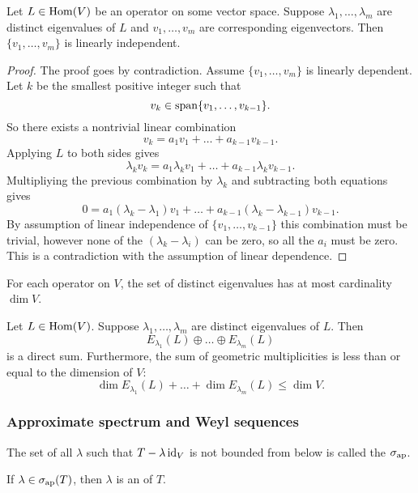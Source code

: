 \begin{proposition}
Let $L\in\operatorname{Hom}(V)$ be an operator on some vector space. Suppose $\lambda_1, \ldots, \lambda_m$ are distinct eigenvalues of $L$ and $v_1,\ldots, v_m$ are corresponding eigenvectors. Then $\{v_1,\ldots, v_m\}$ is linearly independent.
\end{proposition}
\begin{proof}
The proof goes by contradiction. Assume $\{v_1,\ldots, v_m\}$ is linearly dependent. Let $k$ be the smallest positive integer such that
\[ v_k \in \operatorname{span}\{v_1,\ldots, v_{k-1}\}. \]
So there exists a nontrivial linear combination
\[ v_k = a_1v_1+\ldots +a_{k-1}v_{k-1}. \]
Applying $L$ to both sides gives
\[ \lambda_kv_k = a_1\lambda_kv_1+\ldots +a_{k-1}\lambda_kv_{k-1}. \]
Multipliying the previous combination by $\lambda_k$ and subtracting both equations gives
\[ 0= a_1(\lambda_k-\lambda_1)v_1 +\ldots + a_{k-1}(\lambda_k - \lambda_{k-1})v_{k-1}. \]
By assumption of linear independence of $\{v_1,\ldots, v_{k-1}\}$ this combination must be trivial, however none of the $(\lambda_k-\lambda_i)$ can be zero, so all the $a_i$ must be zero. This is a contradiction with the assumption of linear dependence.
\end{proof}
\begin{corollary}
For each operator on $V$, the set of distinct eigenvalues has at most cardinality $\dim V$.
\end{corollary}
\begin{corollary}
Let $L\in\operatorname{Hom}(V)$. Suppose $\lambda_1, \ldots, \lambda_m$ are distinct eigenvalues of $L$. Then
\[ E_{\lambda_1}(L) \oplus \ldots \oplus E_{\lambda_m}(L) \]
is a direct sum. Furthermore, the sum of geometric multiplicities is less than or equal to the dimension of $V$:
\[ \dim E_{\lambda_1}(L) + \ldots + \dim E_{\lambda_m}(L) \leq \dim V. \]
\end{corollary}

\subsubsection{Approximate spectrum and Weyl sequences}
\begin{definition}
The set of all $\lambda$ such that $T-\lambda \operatorname{id}_V$ is not bounded from below is called the  $\sigma_\text{ap}$.

If $\lambda\in\sigma_\text{ap}(T)$, then $\lambda$ is an  of $T$.
\end{definition}

